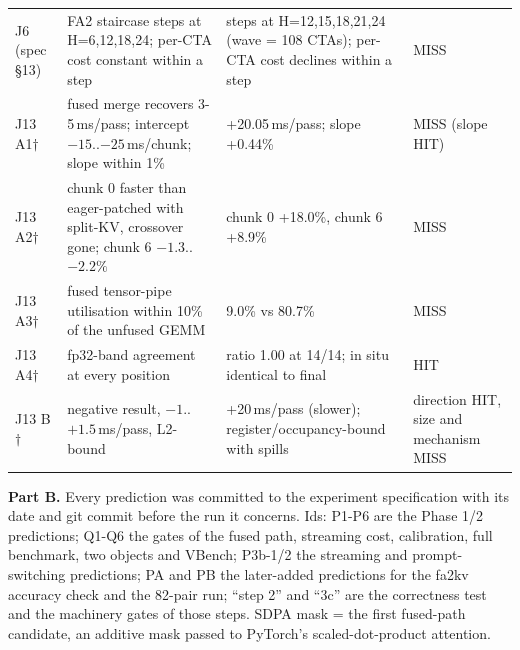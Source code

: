 \documentclass[10pt,a4paper]{article}
\begin{document}
\begin{tabularx}{\textwidth}{lYYl}
J6 (spec \S13) & FA2 staircase steps at H=6,12,18,24; per-CTA cost constant within a step & steps at H=12,15,18,21,24 (wave = 108 CTAs); per-CTA cost declines within a step & MISS\\
J13 A1$\dagger$ & fused merge recovers 3-5\,ms/pass; intercept $-15$..$-25$\,ms/chunk; slope within 1\% & +20.05\,ms/pass; slope +0.44\% & MISS (slope HIT)\\
J13 A2$\dagger$ & chunk 0 faster than eager-patched with split-KV, crossover gone; chunk 6 $-1.3$..$-2.2\%$ & chunk 0 +18.0\%, chunk 6 +8.9\% & MISS\\
J13 A3$\dagger$ & fused tensor-pipe utilisation within 10\% of the unfused GEMM & 9.0\% vs 80.7\% & MISS\\
J13 A4$\dagger$ & fp32-band agreement at every position & ratio 1.00 at 14/14; in situ identical to final & HIT\\
J13 B$\dagger$ & negative result, $-1$..$+1.5$\,ms/pass, L2-bound & +20\,ms/pass (slower); register/occupancy-bound with spills & direction HIT, size and mechanism MISS\\
\bottomrule\end{tabularx}

\medskip
\textbf{Part B.} Every prediction was committed to the experiment specification with its date and git commit before the run it concerns. Ids: P1-P6 are the Phase 1/2 predictions; Q1-Q6 the gates of the fused path, streaming cost, calibration, full benchmark, two objects and VBench; P3b-1/2 the streaming and prompt-switching predictions; PA and PB the later-added predictions for the fa2kv accuracy check and the 82-pair run; ``step 2'' and ``3c'' are the correctness test and the machinery gates of those steps. SDPA mask = the first fused-path candidate, an additive mask passed to PyTorch's scaled-dot-product attention.
\end{document}
